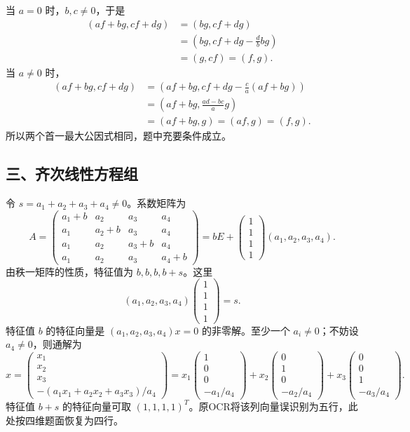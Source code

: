 \documentclass[11pt,fontset=fandol]{ctexart}
\begin{document}
当 \(a=0\) 时，\(b,c\ne0\)，于是 \[
\begin{aligned}
(af+bg,cf+dg)&=(bg,cf+dg)\\
&=\left(bg,cf+dg-\frac dbbg\right)\\
&=(g,cf)=(f,g).
\end{aligned}
\] 当 \(a\ne0\) 时， \[
\begin{aligned}
(af+bg,cf+dg)
&=\left(af+bg,cf+dg-\frac ca(af+bg)\right)\\
&=\left(af+bg,\frac{ad-bc}{a}g\right)\\
&=(af+bg,g)=(af,g)=(f,g).
\end{aligned}
\] 所以两个首一最大公因式相同，题中充要条件成立。

\subsection{三、齐次线性方程组}\label{ux4e09ux9f50ux6b21ux7ebfux6027ux65b9ux7a0bux7ec4}

令 \(s=a_1+a_2+a_3+a_4\ne0\)。系数矩阵为 \[
A=\begin{pmatrix}
a_1+b&a_2&a_3&a_4\\a_1&a_2+b&a_3&a_4\\
a_1&a_2&a_3+b&a_4\\a_1&a_2&a_3&a_4+b
\end{pmatrix}
=bE+\begin{pmatrix}1\\1\\1\\1\end{pmatrix}(a_1,a_2,a_3,a_4).
\] 由秩一矩阵的性质，特征值为 \(b,b,b,b+s\)。这里 \[
(a_1,a_2,a_3,a_4)\begin{pmatrix}1\\1\\1\\1\end{pmatrix}=s.
\] 特征值 \(b\) 的特征向量是 \((a_1,a_2,a_3,a_4)x=0\) 的非零解。至少一个
\(a_i\ne0\)；不妨设 \(a_4\ne0\)，则通解为 \[
x=\begin{pmatrix}x_1\\x_2\\x_3\\-(a_1x_1+a_2x_2+a_3x_3)/a_4\end{pmatrix}
=x_1\begin{pmatrix}1\\0\\0\\-a_1/a_4\end{pmatrix}
+x_2\begin{pmatrix}0\\1\\0\\-a_2/a_4\end{pmatrix}
+x_3\begin{pmatrix}0\\0\\1\\-a_3/a_4\end{pmatrix}.
\] 特征值 \(b+s\) 的特征向量可取
\((1,1,1,1)^T\)。原OCR将该列向量误识别为五行，此处按四维题面恢复为四行。
\end{document}

